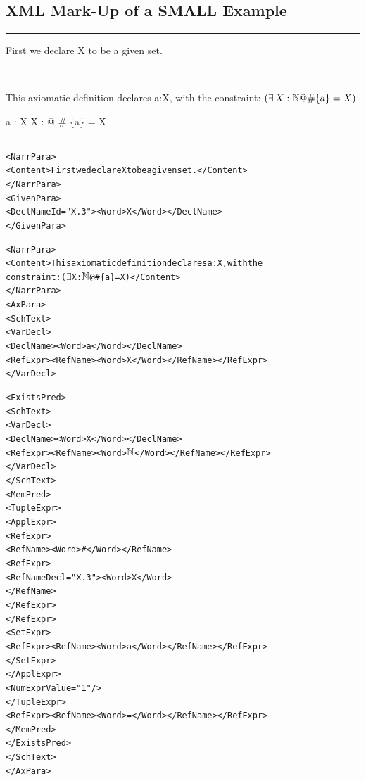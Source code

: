 \documentclass[%
   slidesonly,%
   semhelv,%
   landscape]{seminar}
\begin{document}
\begin{slide}
\section{XML Mark-Up of a SMALL Example}
\newcommand{\NAT}{$\nat$}
\newcommand{\EXISTS}{$\exists$}
\begin{footnotesize}
\hrule
First we declare X to be a given set.
\begin{zed}
    [X] \\
\end{zed}
This axiomatic definition declares a:X, with the
  constraint: $(\exists X:\nat @ \#\{a\} = X)$
\begin{axdef}
    a : X
\where
    \exists X : \nat @ \# \{a\} = X
\end{axdef}
\hrule
\begin{alltt}
<NarrPara>
  <Content>First we declare X to be a given set.</Content>
</NarrPara>
<GivenPara>
  <DeclName Id="X.3"> <Word>X</Word> </DeclName>
</GivenPara>

<NarrPara>
  <Content>This axiomatic definition declares a:X, with the
  constraint: (\EXISTS X:\NAT @ #\{a\} = X)</Content>
</NarrPara>
<AxPara>
  <SchText>
    <VarDecl>
      <DeclName> <Word>a</Word> </DeclName>
      <RefExpr><RefName><Word>X</Word></RefName></RefExpr>
    </VarDecl>

    <ExistsPred>
      <SchText>
        <VarDecl>
          <DeclName> <Word>X</Word> </DeclName>
          <RefExpr><RefName><Word>\NAT</Word></RefName></RefExpr>
        </VarDecl>
      </SchText>
      <MemPred>
        <TupleExpr>
          <ApplExpr>
            <RefExpr>
              <RefName><Word>#</Word></RefName>
              <RefExpr>
                <RefName Decl="X.3"> <Word>X</Word>
                </RefName>
              </RefExpr>
            </RefExpr>
            <SetExpr>
              <RefExpr><RefName><Word>a</Word></RefName></RefExpr>
            </SetExpr>
          </ApplExpr>
          <NumExpr Value="1"/>
        </TupleExpr>
        <RefExpr><RefName><Word>=</Word></RefName></RefExpr>
      </MemPred>
    </ExistsPred>
  </SchText>
</AxPara>
\end{alltt}
\end{footnotesize}
\end{slide}
\end{document}

